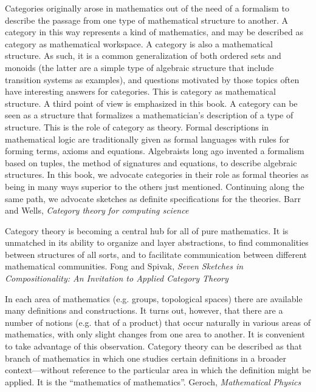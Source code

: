 \documentclass[11pt,openany]{book}
\begin{document}
\begin{boxquote}
Categories originally arose in mathematics out of the need of a formalism to
describe the passage from one type of mathematical structure to another. A
category in this way represents a kind of mathematics, and may be described
as category as mathematical workspace.
A category is also a mathematical structure. As such, it is a common
generalization of both ordered sets and monoids (the latter are a simple
type of algebraic structure that include transition systems as examples),
and questions motivated by those topics often have interesting answers for
categories. This is category as mathematical structure.
A third point of view is emphasized in this book. A category can be seen
as a structure that formalizes a mathematician's description of a type of
structure. This is the role of category as theory. Formal descriptions in
mathematical logic are traditionally given as formal languages with rules for
forming terms, axioms and equations. Algebraists long ago invented a formalism
based on tuples, the method of signatures and equations, to describe
algebraic structures. In this book, we advocate categories in their role as formal
theories as being in many ways superior to the others just mentioned.
Continuing along the same path, we advocate sketches as definite specifications
for the theories.
\tcblower
{Barr and Wells, \textit{Category theory for computing science}~\cite{barr_wells_2020}}
\end{boxquote}

\begin{boxquote}
Category theory is becoming a central hub for all of pure mathematics. It is unmatched
in its ability to organize and layer abstractions, to find commonalities between structures
of all sorts, and to facilitate communication between different mathematical
communities.
\tcblower
{Fong and Spivak, \textit{Seven Sketches in Compositionality: 
An Invitation to Applied Category Theory}~\cite{fong_spivakd_2018_seven_sketches}}
\end{boxquote}

\begin{boxquote}
In each area of mathematics 
(e.g. groups, topological spaces) 
there are available many definitions and constructions.
It turns out, however, that there are a number of notions
(e.g. that of a product) that occur naturally 
in various areas of mathematics, with only slight changes from
one area to another.
It is convenient to take advantage of this observation.
Category theory can be described as that branch of mathematics
in which one studies certain definitions in a broader context---without
reference to the particular area 
in which the definition might be applied.
It is the ``mathematics of mathematics''.
\tcblower
{Geroch, \textit{Mathematical Physics}~\cite{geroch_1985}}
\end{boxquote}
\end{document}
